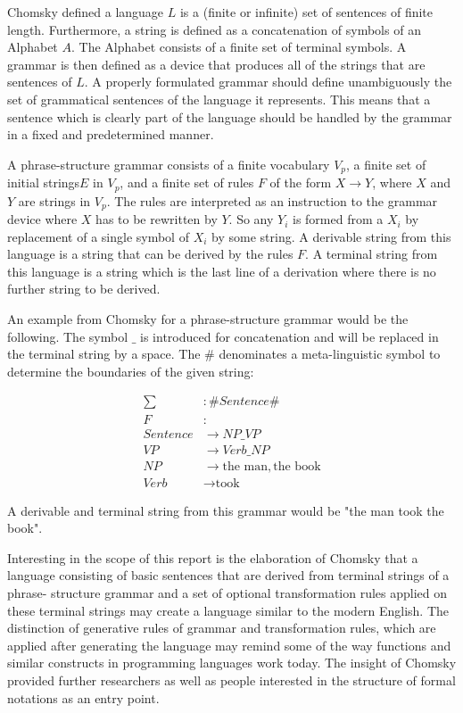 \documentclass{article}
\begin{document}
Chomsky defined a language $L$ is a (finite or infinite) set of sentences of finite length. Furthermore, a string is defined as a concatenation of symbols of an Alphabet $A$. The Alphabet consists of a finite set of terminal symbols. A grammar is then defined as a device that produces all of the strings that are sentences of $L$. A properly formulated grammar should define unambiguously the set of grammatical sentences of the language it represents. This means that a sentence which is clearly part of the language should be handled by the grammar in a fixed and predetermined manner.

A phrase-structure grammar consists of a finite vocabulary $V_p$, a finite set of initial strings$E$ in $V_p$, and a finite set of rules $F$ of the form $X \to Y$, where $X$ and $Y$ are strings in $V_p$. The rules are interpreted as an instruction to the grammar device where $X$ has to be rewritten by $Y$. So any $Y_i$ is formed from a $X_i$ by replacement of a single symbol of $X_i$ by some string. A derivable string from this language is a string that can be derived by the rules $F$. A terminal string from this language is a string which is the last line of a derivation where there is no further string to be derived.

An example from Chomsky for a phrase-structure grammar would be the following. The symbol $\_$ is introduced for concatenation and will be replaced in the terminal string by a space. The \# denominates a meta-linguistic symbol to determine the boundaries of the given string:

\begin{equation} \label{eq1}
	\begin{split}
		\sum &: \# Sentence \# \\
		F&: \\ Sentence &\to NP\_VP \\
		VP &\to Verb\_NP \\
		NP &\to \text{the man}, \text{the book} \\
		Verb &\to \text{took}
	\end{split}
\end{equation}

A derivable and terminal string from this grammar would be "the man took the book".

Interesting in the scope of this report is the elaboration of Chomsky that a language consisting of basic sentences that are derived from terminal strings of a phrase- structure grammar and a set of optional transformation rules applied on these terminal strings may create a language similar to the modern English. The distinction of generative rules of grammar and transformation rules, which are applied after generating the language may remind some of the way functions and similar constructs in programming languages work today. The insight of Chomsky provided further researchers as well as people interested in the structure of formal notations as an entry point.
\end{document}
